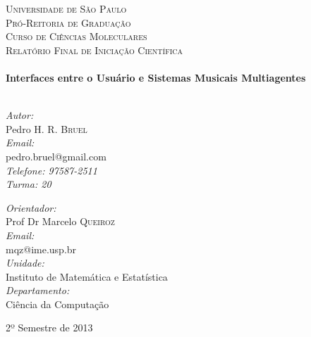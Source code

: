 \begin{titlepage}

\begin{center}


\textsc{\LARGE Universidade de São Paulo}\\
\textsc{\Large Pró-Reitoria de Graduação}\\
\textsc{\Large Curso de Ciências Moleculares}\\[1.5cm]
\textsc{\Large Relatório Final de Iniciação Científica}\\[0.5cm]

\HRule \\[0.4cm]
{ \LARGE \bfseries Interfaces entre o Usuário e Sistemas Musicais Multiagentes}\\[0.4cm]

\HRule \\[1.5cm]

\begin{minipage}{0.4\textwidth}
\begin{flushleft} \normalsize
\emph{Autor:}\\
Pedro H. R. \textsc{Bruel} \\
\vspace{0.3cm}
\emph{Email:}\\
pedro.bruel@gmail.com \\
\vspace{0.3cm}
\emph{Telefone: 97587-2511}\\
\vspace{0.3cm}
\emph{Turma: 20}\\
\end{flushleft}
\end{minipage}
\begin{minipage}{0.5\textwidth}
\begin{flushright} \normalsize
\emph{Orientador:} \\
Prof Dr Marcelo \textsc{Queiroz} \\
\vspace{0.3cm}
\emph{Email:}\\
mqz@ime.usp.br \\
\vspace{0.3cm}
\emph{Unidade: }\\
Instituto de Matemática e Estatística \\
\vspace{0.3cm}
\emph{Departamento: }\\
Ciência da Computação\\
\end{flushright}
\end{minipage}
\vfill
{\large 2º Semestre de 2013}

\end{center}

\end{titlepage}
